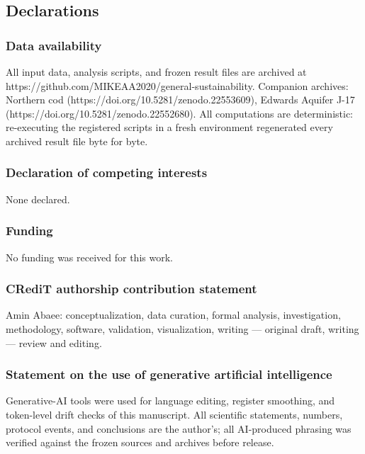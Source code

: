 \documentclass[11pt]{article}
\begin{document}
\subsection{Declarations}\label{declarations}

\subsubsection{Data availability}\label{data-availability}

All input data, analysis scripts, and frozen result files are archived
at https://github.com/MIKEAA2020/general-sustainability. Companion
archives: Northern cod (https://doi.org/10.5281/zenodo.22553609),
Edwards Aquifer J-17 (https://doi.org/10.5281/zenodo.22552680). All
computations are deterministic: re-executing the registered scripts in a
fresh environment regenerated every archived result file byte for byte.

\subsubsection{Declaration of competing
interests}\label{declaration-of-competing-interests}

None declared.

\subsubsection{Funding}\label{funding}

No funding was received for this work.

\subsubsection{CRediT authorship contribution
statement}\label{credit-authorship-contribution-statement}

Amin Abaee: conceptualization, data curation, formal analysis,
investigation, methodology, software, validation, visualization, writing
--- original draft, writing --- review and editing.

\subsubsection{Statement on the use of generative artificial
intelligence}\label{statement-on-the-use-of-generative-artificial-intelligence}

Generative-AI tools were used for language editing, register smoothing,
and token-level drift checks of this manuscript. All scientific
statements, numbers, protocol events, and conclusions are the author's;
all AI-produced phrasing was verified against the frozen sources and
archives before release.
\end{document}
